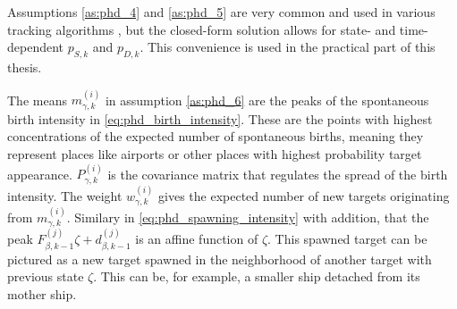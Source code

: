 Assumptions \ref{as:phd_4} and \ref{as:phd_5} are very common and used in various tracking algorithms \cite{bar1988tracking}, but the closed-form solution allows for state- and time-dependent $p_{S,k}$ and $p_{D,k}$. This convenience is used in the practical part of this thesis.

The means $m_{\gamma,k}^{(i)}$ in assumption \ref{as:phd_6} are the peaks of the spontaneous birth intensity in \eqref{eq:phd_birth_intensity}. These are the points with highest concentrations of the expected number of spontaneous births, meaning they represent places like airports or other places with highest probability target appearance. $P_{\gamma,k}^{(i)}$ is the covariance matrix that regulates the spread of the birth intensity. The weight $w_{\gamma, k}^{(i)}$ gives the expected number of new targets originating from $m_{\gamma,k}^{(i)}$. Similary in \eqref{eq:phd_spawning_intensity} with addition, that the peak $F_{\beta,k-1}^{(j)}\zeta + d_{\beta,k-1}^{(j)}$ is an affine function of $\zeta$. This spawned target can be pictured as a new target spawned in the neighborhood of another target with previous state $\zeta$. This can be, for example, \linebreak a smaller ship detached from its mother ship.

